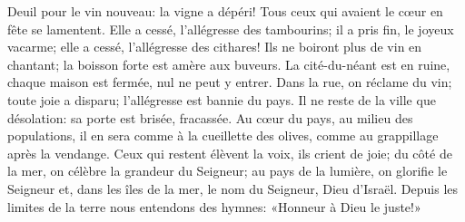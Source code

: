 Deuil pour le vin nouveau: la vigne a dépéri!
	Tous ceux qui avaient le cœur en fête se lamentent.
Elle a cessé, l’allégresse des tambourins;
	il a pris fin, le joyeux vacarme;
	elle a cessé, l’allégresse des cithares!
Ils ne boiront plus de vin en chantant;
	la boisson forte est amère aux buveurs.
La cité-du-néant est en ruine,
	chaque maison est fermée, nul ne peut y entrer.
Dans la rue, on réclame du vin;
	toute joie a disparu; l’allégresse est bannie du pays.
Il ne reste de la ville que désolation:
	sa porte est brisée, fracassée.
Au cœur du pays, au milieu des populations,
	il en sera comme à la cueillette des olives,
	comme au grappillage après la vendange.
Ceux qui restent élèvent la voix, ils crient de joie;
	du côté de la mer, on célèbre la grandeur du Seigneur;
	au pays de la lumière, on glorifie le Seigneur
	et, dans les îles de la mer, le nom du Seigneur, Dieu d’Israël.
Depuis les limites de la terre nous entendons des hymnes:
	«Honneur à Dieu le juste!»
